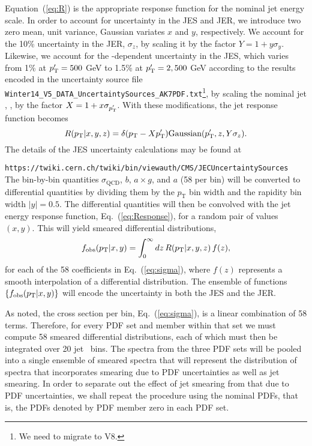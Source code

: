 \documentclass[aps,prd,preprint,nofootinbib]{revtex4}
\begin{document}
Equation~(\ref{eq:R}) is the appropriate response function for the nominal jet energy scale. 
In order to account for uncertainty in the JES and JER, we introduce two zero mean, unit
variance, Gaussian variates  $x$ and $y$, respectively.  
We account for the 10\% uncertainty in the JER, $\sigma_z$, by scaling it by the
factor $Y = 1 + y\sigma_y$. Likewise, we account for the \pT-dependent uncertainty
in the JES, which varies from 1\% at $\textrm{$p_\textrm{T}^\prime$} = 500$ GeV to 1.5\% at $\textrm{$p_\textrm{T}^\prime$} = 2,500$ GeV
according to the results encoded in the uncertainty source file {\tt Winter14\_V5\_DATA\_UncertaintySources\_AK7PDF.txt}\footnote{We need to migrate to V8.}, by scaling the nominal jet \pT, \pTprime, by the 
 factor $X = 1 + x \sigma_{\textrm{$p_\textrm{T}^\prime$}}$.  With these modifications, the jet response function
 becomes
\begin{equation}
R(\textrm{$p_\textrm{T}$}| x, y, z) = \delta(\textrm{$p_\textrm{T}$} - X\textrm{$p_\textrm{T}^\prime$}) \textrm{Gaussian}(\textrm{$p_\textrm{T}^\prime$}, z,  Y\sigma_z). 
\label{eq:Response}
\end{equation}
The details of the JES uncertainty calculations may be found at

{\tt https://twiki.cern.ch/twiki/bin/viewauth/CMS/JECUncertaintySources}\\
 
The bin-by-bin quantities $\sigma_\textrm{QCD}$, $b$, $a \times g$, and $a$ (58 per bin) will
be converted to differential quantities by dividing them by the $p_\textrm{T}$ bin width and the rapidity bin width $|y| = 0.5$.  The differential quantities will
then be convolved with the jet energy response function, Eq.~(\ref{eq:Response}), for 
a random pair of values $(x, y)$. This will yield smeared differential distributions,
 \begin{equation}
	f_\textrm{obs}(\textrm{$p_\textrm{T}$} | x,  y) =   \int_0^\infty dz \,  R(\textrm{$p_\textrm{T}$} | x, y, z) \, f(z),
	\label{eq:cj}
\end{equation}
for each of the 58  coefficients  in Eq.~(\ref{eq:sigma}),
where $f(z)$ represents a smooth interpolation of a differential distribution. The ensemble
of functions $\{ f_\textrm{obs}(\textrm{$p_\textrm{T}$} | x,  y) \}$ will encode the uncertainty in both the JES and the JER.

As noted, the cross section per bin, Eq.~(\ref{eq:sigma}), is a linear combination of 58 terms. Therefore, for every PDF set and member within that set we must 
compute 58 smeared differential distributions, each of which must then be integrated over
 20 jet \pT\ bins.  The spectra from the three PDF sets will be pooled into a single ensemble of
smeared spectra that will represent the distribution of spectra that incorporates smearing due to
PDF uncertainties as well as jet smearing.  In order to separate out the effect of jet smearing from
that due to PDF uncertainties, we shall repeat the procedure using the nominal PDFs, that is, the PDFs denoted by PDF member zero in each PDF set. 
%
\end{document}
